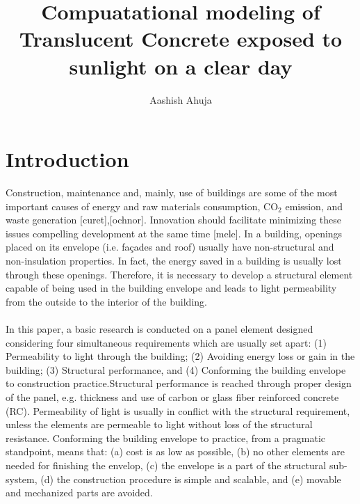 \documentclass[times, 10pt,a4paper]{article}
\begin{document}
\title{Compuatational modeling of Translucent Concrete exposed to sunlight on a clear day}
\author{Aashish Ahuja}
\maketitle
\section{Introduction}
Construction, maintenance and, mainly, use of buildings are some of the most important causes of energy and raw materials consumption, 
CO$_2$ emission, and waste generation [curet],[ochnor]. Innovation should facilitate minimizing these issues compelling development at the same time [mele]. 
In a building, openings placed on its envelope (i.e. fa\c{c}ades and roof) usually have non-structural and non-insulation properties. 
In fact, the energy saved in a building is usually lost through these openings. Therefore, it is necessary to develop a structural element 
capable of being used in the building envelope and leads to light permeability from the outside to the interior of the building. \\ \\
In this paper, a basic research is conducted on a panel element designed considering four simultaneous requirements which are usually
 set apart: (1) Permeability to light through the building; (2) Avoiding energy loss or gain in the building; (3) Structural performance, 
and (4) Conforming the building envelope to construction practice.Structural performance is reached through proper design of the panel, 
e.g. thickness and use of carbon or glass fiber reinforced concrete (RC). Permeability of light is usually in conflict with the structural 
requirement, unless the elements are permeable to light without loss of the structural resistance. Conforming the building envelope to
practice, from a pragmatic standpoint, means that: (a) cost is as low as possible, (b) no other elements are needed for finishing the 
envelop, (c) the envelope is a part of the structural sub-system, (d) the construction procedure is simple and scalable, and 
(e) movable and mechanized parts are avoided. 
\end{document}
